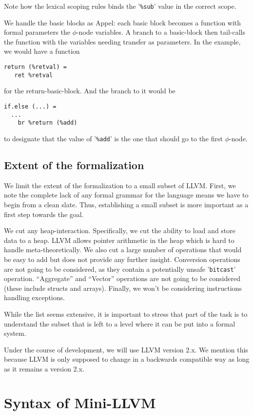\documentclass[a4paper, oneside, 10pt, draft]{memoir}
\begin{document}
Note how the lexical scoping rules binds the '\texttt{\%sub}' value
in the correct scope.

We handle the basic blocks as Appel: each basic block becomes a
function with formal parameters the $\phi$-node variables. A branch to
a basic-block then tail-calls the function with the variables needing
transfer as parameters. In the example, we would have a function
\begin{verbatim}
return (%retval) =
   ret %retval
\end{verbatim}
for the return-basic-block. And the branch to it would be
\begin{verbatim}
if.else (...) =
  ...
    br %return (%add)
\end{verbatim}
to designate that the value of '\texttt{\%add}' is the one that should
go to the first $\phi$-node.

\section{Extent of the formalization}

We limit the extent of the formalization to a small subset of
LLVM. First, we note the complete lack of any formal grammar for
the language means we have to begin from a clean slate. Thus,
establishing a small subset is more important as a first step towards
the goal.

We cut any heap-interaction. Specifically, we cut the ability to
load and store data to a heap. LLVM allows pointer arithmetic in the
heap which is hard to handle meta-theoretically. We also cut a large
number of operations that would be easy to add but does not provide
any further insight. Conversion operations are not going to be
considered, as they contain a potentially unsafe '\texttt{bitcast}'
operation. ``Aggregate'' and ``Vector'' operations are not going to be
considered (these include structs and arrays). Finally, we won't be
considering instructions handling exceptions.

While the list seems extensive, it is important to stress that part of
the task is to understand the subset that is left to a level where it
can be put into a formal system.

Under the course of development, we will use LLVM version 2.x. We
mention this because LLVM is only supposed to change in a backwards
compatible way as long as it remains a version 2.x.

\chapter{Syntax of Mini-LLVM}
\end{document}
